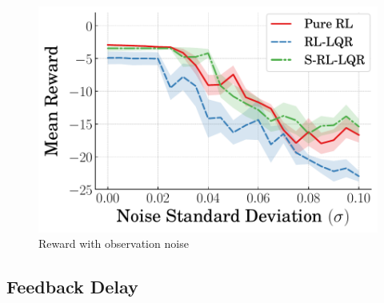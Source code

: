 
\begin{figure}[t]
    \centering
    \includegraphics[scale=0.65]{figures/figures_robustness/invpend_robustness/noise_reward}
    \caption{Reward with observation noise}
    \label{fig:noise_reward}
\end{figure}

\subsection{Feedback Delay}

